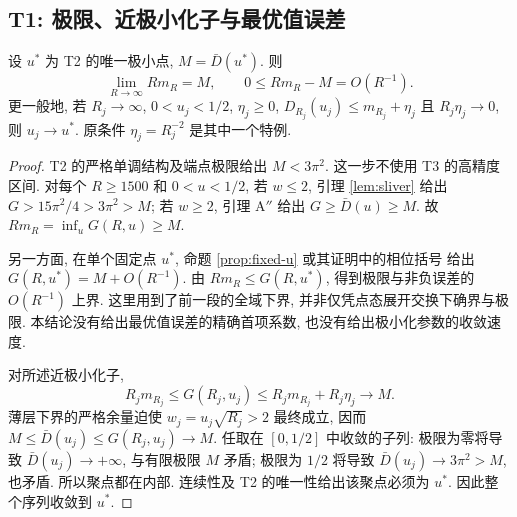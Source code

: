 \subsection{T1: 极限、近极小化子与最优值误差}\label{sec:T1}
\begin{theorem}[T1, 解析修订]\label{thm:T1}
设 $u^*$ 为 T2 的唯一极小点, $M=\bar D(u^*)$. 则
\[
 \lim_{R\to\infty}Rm_R=M,\qquad 0\le Rm_R-M=O(R^{-1}).
\]
更一般地, 若 $R_j\to\infty$, $0<u_j<1/2$, $\eta_j\ge0$,
$D_{R_j}(u_j)\le m_{R_j}+\eta_j$ 且 $R_j\eta_j\to0$,
则 $u_j\to u^*$. 原条件 $\eta_j=R_j^{-2}$ 是其中一个特例.
\end{theorem}
\begin{proof}
T2 的严格单调结构及端点极限给出 $M<3\pi^2$.
这一步不使用 T3 的高精度区间. 对每个 $R\ge1500$ 和 $0<u<1/2$,
若 $w\le2$, 引理 \ref{lem:sliver} 给出 $G>15\pi^2/4>3\pi^2>M$;
若 $w\ge2$, 引理 A$''$ 给出 $G\ge\bar D(u)\ge M$.
故 $Rm_R=\inf_u G(R,u)\ge M$.

另一方面, 在单个固定点 $u^*$, 命题 \ref{prop:fixed-u} 或其证明中的相位括号
给出 $G(R,u^*)=M+O(R^{-1})$. 由 $Rm_R\le G(R,u^*)$, 得到极限与非负误差的 $O(R^{-1})$ 上界.
这里用到了前一段的全域下界, 并非仅凭点态展开交换下确界与极限.
本结论没有给出最优值误差的精确首项系数, 也没有给出极小化参数的收敛速度.

对所述近极小化子,
\[
 R_jm_{R_j}\le G(R_j,u_j)\le R_jm_{R_j}+R_j\eta_j\longrightarrow M.
\]
薄层下界的严格余量迫使 $w_j=u_j\sqrt{R_j}>2$ 最终成立, 因而
$M\le\bar D(u_j)\le G(R_j,u_j)\to M$.
任取在 $[0,1/2]$ 中收敛的子列: 极限为零将导致 $\bar D(u_j)\to+\infty$,
与有限极限 $M$ 矛盾; 极限为 $1/2$ 将导致 $\bar D(u_j)\to3\pi^2>M$, 也矛盾.
所以聚点都在内部. 连续性及 T2 的唯一性给出该聚点必须为 $u^*$.
因此整个序列收敛到 $u^*$.
\end{proof}

